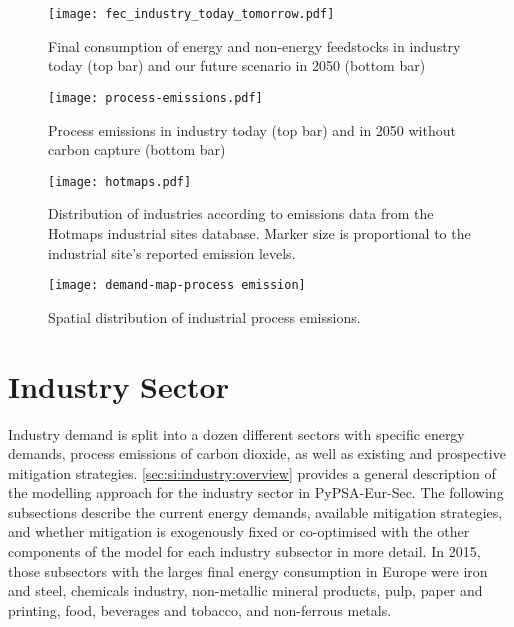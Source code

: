\begin{SCfigure}
    \texttt{[image: fec\_industry\_today\_tomorrow.pdf]}
    \caption{Final consumption of energy and non-energy feedstocks in industry today (top bar) and
    our future scenario in 2050 (bottom bar)}
    \label{fig:fec-industry}
\end{SCfigure}

\begin{SCfigure}
    \texttt{[image: process-emissions.pdf]}
    \caption{Process emissions in industry today (top bar) and in 2050 without carbon capture (bottom bar)}
    \label{fig:process-emissions}
\end{SCfigure}


\begin{SCfigure}
    \texttt{[image: hotmaps.pdf]}
    \caption{Distribution of industries according to emissions data from the Hotmaps industrial sites database. Marker size is proportional to the industrial site's reported emission levels.}
    \label{fig:hotmaps}
\end{SCfigure}

\begin{SCfigure}
    \texttt{[image: demand-map-process emission]}
    \caption{Spatial distribution of industrial process emissions.}
    \label{fig:spatial-process-emissions}
\end{SCfigure}

\section{Industry Sector}
\label{sec:si:industry}

Industry demand is split into a dozen different sectors with specific energy
demands, process emissions of carbon dioxide, as well as existing and
prospective mitigation strategies. \cref{sec:si:industry:overview} provides a
general description of the modelling approach for the industry sector in
PyPSA-Eur-Sec. The following subsections describe the current energy demands,
available mitigation strategies, and whether mitigation is exogenously fixed or
co-optimised with the other components of the model for each industry subsector
in more detail. In 2015, those subsectors with the larges final energy
consumption in Europe were iron and steel, chemicals industry, non-metallic
mineral products, pulp, paper and printing, food, beverages and tobacco, and
non-ferrous metals.

